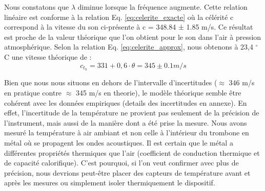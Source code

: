 Nous constatons que \(\lambda\) diminue lorsque la fréquence augmente. Cette relation linéaire est conforme à la relation Eq. \ref{eq:celerite_exacte} où la célérité c correspond à la vitesse du son ci-présente à c = 348.84 ± 1.85 m/s. Ce résultat est proche de la valeur théorique que l'on obtient pour le son dans l'air à pression atmosphérique. Selon la relation Eq. \ref{eq:celerite_approx}, nous obtenons à 23,4 $^\circ$C une vitesse théorique de :
\[
    c_t_h =331+0,6\cdot \theta = 345 \pm 0.1 m/s
\]

Bien que nous nous situons en dehors de l'intervalle d'incertitudes ($\approx$ 346 m/s en pratique contre $\approx$ 345 m/s en theorie), le modèle théorique semble être cohérent avec les données empiriques (details des incertitudes en annexe). En effet, l'incertitude de la température ne provient pas seulement de la précision de l'instrument, mais aussi de la manière dont a été prise la mesure. Nous avons mesuré la température à air ambiant et non celle à l'intérieur du trombone en métal où se propagent les ondes acoustiques. Il est certain que le métal a différentes propriétés thermiques que l'air (coefficient de conduction thermique et de capacité calorifique). C'est pourquoi, si l'on veut confirmer avec plus de précision, nous devrions peut-être placer des capteurs de température avant et après les mesures ou simplement isoler thermiquement le dispositif. 
